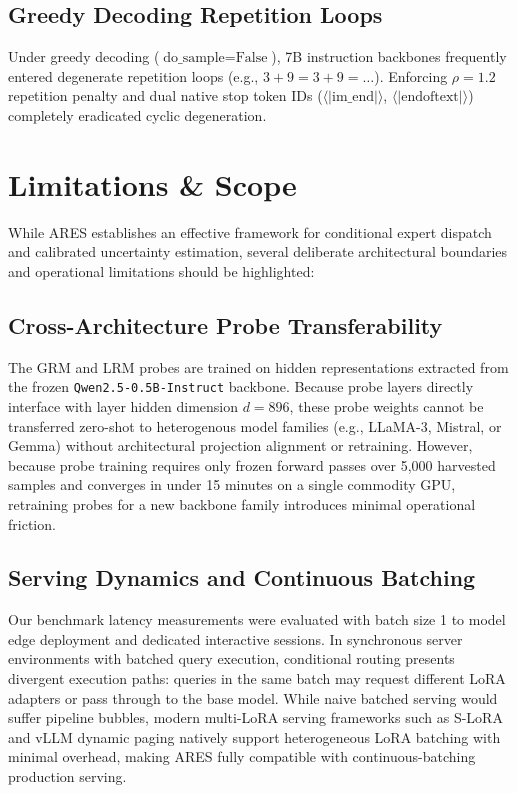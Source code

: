 \documentclass[journal,10pt,twocolumn]{IEEEtran}
\begin{document}
\subsection{Greedy Decoding Repetition Loops}
Under greedy decoding ($\text{do\_sample} = \text{False}$), 7B instruction backbones frequently entered degenerate repetition loops (e.g., $3+9 = 3+9 = \dots$). Enforcing $\rho = 1.2$ repetition penalty and dual native stop token IDs ($\langle|\text{im\_end}|\rangle$, $\langle|\text{endoftext}|\rangle$) completely eradicated cyclic degeneration.

\section{Limitations \& Scope}
\label{sec:limitations}
While ARES establishes an effective framework for conditional expert dispatch and calibrated uncertainty estimation, several deliberate architectural boundaries and operational limitations should be highlighted:

\subsection{Cross-Architecture Probe Transferability}
The GRM and LRM probes are trained on hidden representations extracted from the frozen \texttt{Qwen2.5-0.5B-Instruct} backbone. Because probe layers directly interface with layer hidden dimension $d = 896$, these probe weights cannot be transferred zero-shot to heterogenous model families (e.g., LLaMA-3, Mistral, or Gemma) without architectural projection alignment or retraining. However, because probe training requires only frozen forward passes over 5,000 harvested samples and converges in under 15 minutes on a single commodity GPU, retraining probes for a new backbone family introduces minimal operational friction.

\subsection{Serving Dynamics and Continuous Batching}
Our benchmark latency measurements were evaluated with batch size 1 to model edge deployment and dedicated interactive sessions. In synchronous server environments with batched query execution, conditional routing presents divergent execution paths: queries in the same batch may request different LoRA adapters or pass through to the base model. While naive batched serving would suffer pipeline bubbles, modern multi-LoRA serving frameworks such as S-LoRA \cite{lin2023speciality} and vLLM dynamic paging natively support heterogeneous LoRA batching with minimal overhead, making ARES fully compatible with continuous-batching production serving.
\end{document}

